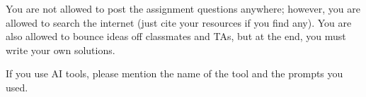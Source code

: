 \documentclass[11pt]{article}
\begin{document}

You are not allowed to post the assignment questions anywhere; however, you are allowed to search the internet (just cite your resources if you find any). You are also allowed to bounce ideas off classmates and TAs, but at the end, you must write your own solutions. 

If you use AI tools, please mention the name of the tool and the prompts you used.

\vspace{0.2cm}


\end{document}
